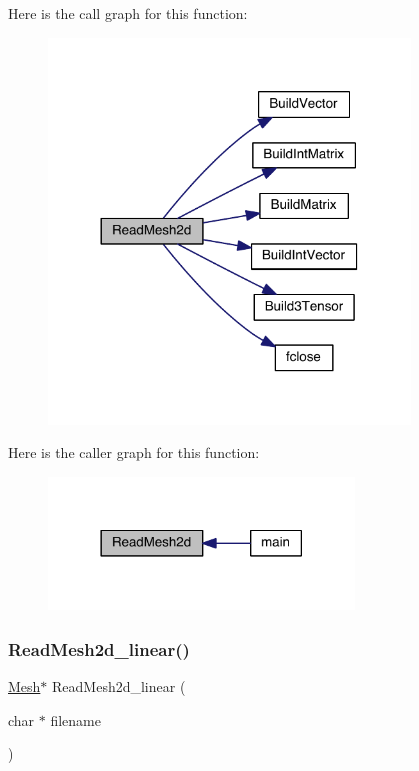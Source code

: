 Here is the call graph for this function\+:\nopagebreak
\begin{figure}[H]
\begin{center}
\leavevmode
\includegraphics[width=272pt]{a00581_af31fd6654ededed596d98c090d8748b5_cgraph}
\end{center}
\end{figure}
Here is the caller graph for this function\+:\nopagebreak
\begin{figure}[H]
\begin{center}
\leavevmode
\includegraphics[width=230pt]{a00581_af31fd6654ededed596d98c090d8748b5_icgraph}
\end{center}
\end{figure}
\mbox{\label{a00581_a992690ab68b8564681b5a038ca111413}} 
\subsubsection{\texorpdfstring{Read\+Mesh2d\+\_\+linear()}{ReadMesh2d\_linear()}}
{\footnotesize\ttfamily \hyperlink{a00557_aeffbe0891ab73a4d8964c9cb7978426e}{Mesh}$\ast$ Read\+Mesh2d\+\_\+linear (\begin{DoxyParamCaption}\item[{char $\ast$}]{filename }\end{DoxyParamCaption})}

